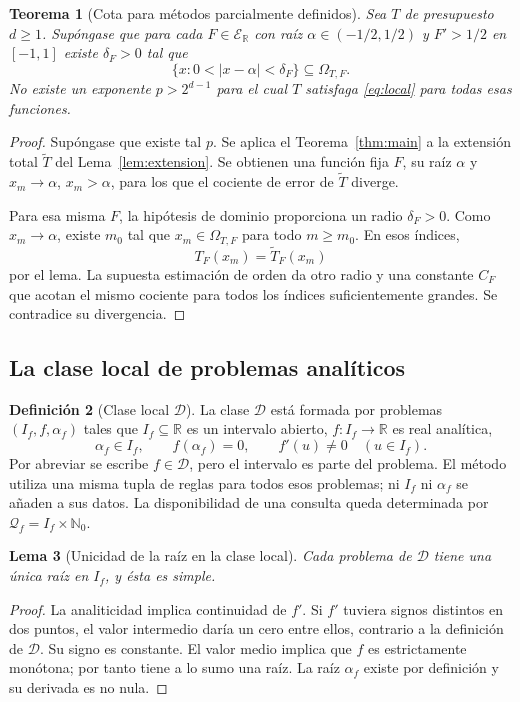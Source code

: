 \documentclass[11pt,a4paper]{article}
\numberwithin{equation}{section}
\newtheorem{theorem}{Teorema}[section]
\newtheorem{lemma}[theorem]{Lema}
\theoremstyle{definition}
\newtheorem{definition}[theorem]{Definición}
\theoremstyle{remark}
\newcommand{\R}{\mathbb R}
\newcommand{\Nn}{\mathbb N_0}
\newcommand{\ER}{\mathcal E_{\R}}
\newcommand{\QQ}{\mathcal Q}
\newcommand{\DD}{\mathcal D}
\begin{document}
\begin{theorem}[Cota para métodos parcialmente definidos]\label{thm:partial}
Sea $T$ de presupuesto $d\ge1$. Supóngase que para cada $F\in\ER$ con raíz $\alpha\in(-1/2,1/2)$ y $F'>1/2$ en $[-1,1]$ existe $\delta_F>0$ tal que
\[
\{x:0<|x-\alpha|<\delta_F\}\subseteq\Omega_{T,F}.
\]
No existe un exponente $p>2^{d-1}$ para el cual $T$ satisfaga \eqref{eq:local} para todas esas funciones.
\end{theorem}
\begin{proof}
Supóngase que existe tal $p$. Se aplica el Teorema~\ref{thm:main} a la extensión total $\widetilde T$ del Lema~\ref{lem:extension}. Se obtienen una función fija $F$, su raíz $\alpha$ y $x_m\to\alpha$, $x_m>\alpha$, para los que el cociente de error de $\widetilde T$ diverge.

Para esa misma $F$, la hipótesis de dominio proporciona un radio $\delta_F>0$. Como $x_m\to\alpha$, existe $m_0$ tal que $x_m\in\Omega_{T,F}$ para todo $m\ge m_0$. En esos índices,
\[
T_F(x_m)=\widetilde T_F(x_m)
\]
por el lema. La supuesta estimación de orden da otro radio y una constante $C_F$ que acotan el mismo cociente para todos los índices suficientemente grandes. Se contradice su divergencia.
\end{proof}

\subsection{La clase local de problemas analíticos}
\begin{definition}[Clase local $\DD$]\label{def:localclass}
La clase $\DD$ está formada por problemas $(I_f,f,\alpha_f)$ tales que $I_f\subseteq\R$ es un intervalo abierto, $f:I_f\to\R$ es real analítica,
\[
\alpha_f\in I_f,\qquad f(\alpha_f)=0,\qquad
f'(u)\ne0\quad(u\in I_f).
\]
Por abreviar se escribe $f\in\DD$, pero el intervalo es parte del problema. El método utiliza una misma tupla de reglas para todos esos problemas; ni $I_f$ ni $\alpha_f$ se añaden a sus datos. La disponibilidad de una consulta queda determinada por $\QQ_f=I_f\times\Nn$.
\end{definition}

\begin{lemma}[Unicidad de la raíz en la clase local]\label{lem:localunique}
Cada problema de $\DD$ tiene una única raíz en $I_f$, y ésta es simple.
\end{lemma}
\begin{proof}
La analiticidad implica continuidad de $f'$. Si $f'$ tuviera signos distintos en dos puntos, el valor intermedio daría un cero entre ellos, contrario a la definición de $\DD$. Su signo es constante. El valor medio implica que $f$ es estrictamente monótona; por tanto tiene a lo sumo una raíz. La raíz $\alpha_f$ existe por definición y su derivada es no nula.
\end{proof}
\end{document}
